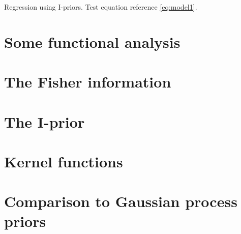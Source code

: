\documentclass[a4paper,showframe,11pt,draft]{report}
\begin{document}

Regression using I-priors. Test equation reference \eqref{eq:model1}.

\section{Some functional analysis}


\section{The Fisher information}


\section{The I-prior}


\section{Kernel functions}


\section{Comparison to Gaussian process priors}



\hClosingStuffStandalone
\end{document}

